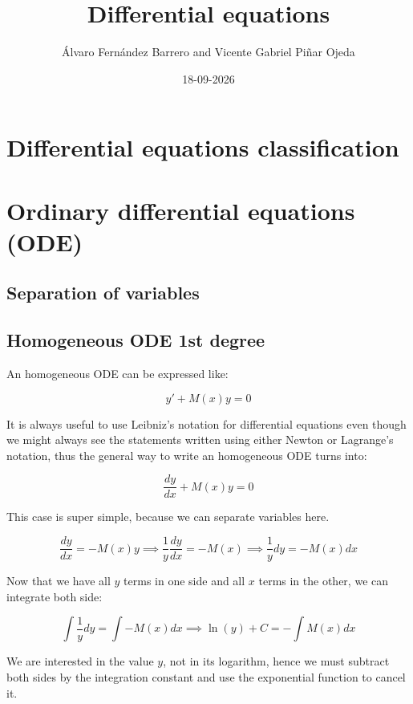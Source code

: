 \documentclass[12pt]{article}
\author{Álvaro Fernández Barrero and Vicente Gabriel Piñar Ojeda}
\title{Differential equations}
\date{18-09-2026}
\begin{document}
	\maketitle
	
	\section{Differential equations classification}
	
	
	\section{Ordinary differential equations (ODE)}
	
	\subsection{Separation of variables}
	
	\subsection{Homogeneous ODE 1st degree}
	
	An homogeneous ODE can be expressed like:
	
	\[
		y' + M(x)y = 0
	\]
	
	It is always useful to use Leibniz's notation for differential equations even though we might always see the statements written using either Newton or Lagrange's notation, thus the general way to write an homogeneous ODE turns into:
	
	\[
		\frac{dy}{dx} + M(x)y = 0
	\]
	
	This case is super simple, because we can separate variables here.
	
	\[
		\frac{dy}{dx} = -M(x)y
		\implies \frac{1}{y} \frac{dy}{dx} = -M(x)
		\implies \frac{1}{y} dy = -M(x) dx
	\]
	
	Now that we have all $y$ terms in one side and all $x$ terms in the other, we can integrate both side:
	
	\[
		\int \frac{1}{y} dy = \int -M(x) dx
		\implies \ln(y) + C = -\int M(x) dx
	\]
	
	We are interested in the value $y$, not in its logarithm, hence we must subtract both sides by the integration constant and use the exponential function to cancel it.
	
\end{document}
